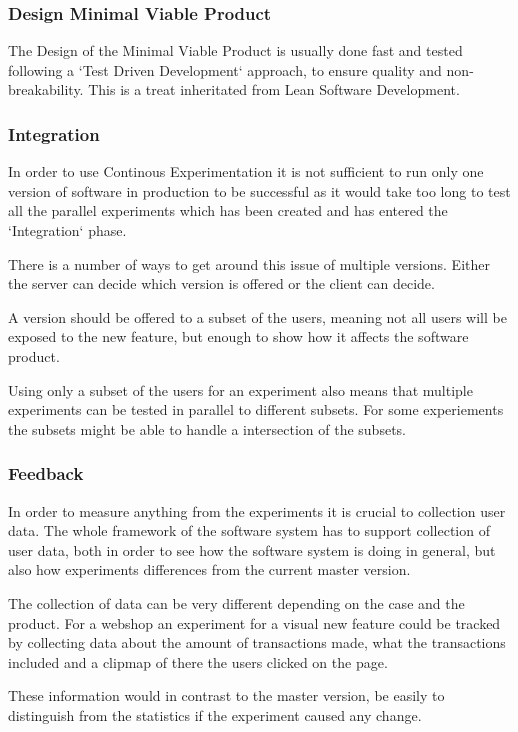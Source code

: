 \documentclass{sig-alternate}
\begin{document}
\subsubsection{Design Minimal Viable Product}
\label{cx:design}
The Design of the Minimal Viable Product is usually done fast and tested following a `Test Driven Development`
approach, to ensure quality and non-breakability. 
This is a treat inheritated from Lean Software Development\footnotemark[\ref{see-lean}].

\subsubsection{Integration}
\label{cx:integration}
In order to use Continous Experimentation it is not sufficient to run only one version of software in 
production to be successful as it would take too long to test all the parallel experiments which has been
created and has entered the `Integration` phase. 

There is a number of ways to get around this issue of multiple versions. 
Either the server can decide which version is offered or the client can decide.

A version should be offered to a subset of the users, meaning not all users will be exposed to the 
new feature, but enough to show how it affects the software product.

Using only a subset of the users for an experiment also means that multiple experiments can be tested in 
parallel to different subsets. For some experiements the subsets might be able to handle a intersection of 
the subsets. 

\subsubsection{Feedback}
\label{cx:feedback}
In order to measure anything from the experiments it is crucial to collection user data.
The whole framework of the software system has to support collection of user data, both in order to see how 
the software system is doing in general, but also how experiments differences from the current master version.

The collection of data can be very different depending on the case and the product. 
For a webshop an experiment for a visual new feature could be tracked by collecting data about the amount 
of transactions made, what the transactions included and a clipmap of there the users clicked on the page.

These information would in contrast to the master version, be easily to distinguish from the statistics if 
the experiment caused any change.
\end{document}
